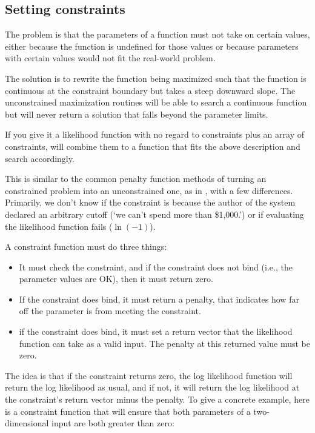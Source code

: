 \subsection{Setting constraints}

The problem is that the parameters of a function must not take on
certain values, either because the function is undefined for those
values or because parameters with certain values would not fit the
real-world problem.

The solution is to rewrite the function being maximized such that the
function is continuous at the constraint boundary but takes a steep
downward slope. The unconstrained maximization routines will be able
to search a continuous function but will never return a solution that
falls beyond the parameter limits.

If you give it a likelihood function with no regard to constraints plus
an array of constraints,  will combine
them to a function that fits the above description and search accordingly.

This is similar to the common penalty function methods of turning an
constrained problem into an unconstrained one, as in \cite{nonlinear},
with a few differences. Primarily, we don't know if the constraint is
because the author of the system declared an arbitrary cutoff (`we can't spend more
than \$1,000.') or if evaluating the likelihood function fails
($\ln(-1)$). 

A constraint function must do three things:
\begin{itemize}
\item It must check the constraint, and if the constraint does not bind (i.e., the parameter values are OK), then it must return zero.
\item If the constraint does bind, it must return a penalty, that indicates how far off the parameter is from meeting the constraint.
\item if the constraint does bind, it must set a return vector that the likelihood function can take as a valid input. The penalty at this returned value must be zero.
\end{itemize}

The idea is that if the constraint returns zero, the log likelihood
function will return the log likelihood as usual, and if not, it will
return the log likelihood at the constraint's return vector minus the
penalty. To give a concrete example, here is a constraint function that
will ensure that both parameters of a two-dimensional input are both
greater than zero:

